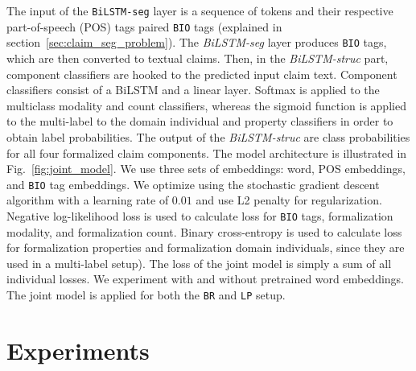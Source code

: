 The input of the \texttt{BiLSTM-seg} layer is a sequence of tokens and their
respective part-of-speech (POS) tags \citep{brown1957linguistic} paired \texttt{BIO}
tags (explained in section~\ref{sec:claim_seg_problem}). 
The \textit{BiLSTM-seg} layer produces \texttt{BIO} tags, which are then converted to textual
claims. Then, in the \textit{BiLSTM-struc} part, component classifiers
are hooked to the predicted input claim text. Component classifiers
consist of a BiLSTM and a linear layer. Softmax is applied to 
the multiclass modality and count classifiers, whereas the sigmoid function is
applied to the multi-label to the domain individual and property classifiers in
order to obtain label probabilities. 
The output of the \textit{BiLSTM-struc} are class probabilities for all four 
formalized claim components. 
The model architecture is illustrated in Fig.~\ref{fig:joint_model}. 
We use three sets of embeddings: word, POS embeddings, and \texttt{BIO} tag
embeddings. We optimize using the stochastic gradient descent algorithm
with a learning rate of $0.01$ and use L2 penalty for regularization. 
Negative log-likelihood loss is used to calculate loss for
\texttt{BIO} tags, formalization modality, and formalization count.
Binary cross-entropy is used to calculate loss for formalization
properties and formalization domain individuals, since they are used in a 
multi-label setup). 
The loss of the joint model is simply a sum of all individual losses. 
We experiment with and without pretrained word embeddings. 
The joint model is applied for both the \texttt{BR} and 
\texttt{LP} setup. 

\section{Experiments}
\label{sec:claim_struc_experiment}

